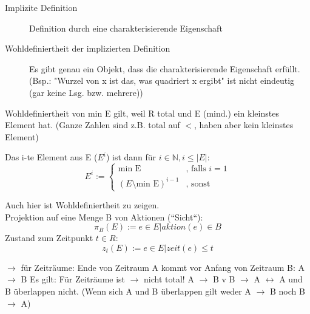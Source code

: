 \begin{description}
\item[Implizite Definition] Definition durch eine charakterisierende Eigenschaft
\item[Wohldefiniertheit der implizierten Definition] Es gibt genau ein Objekt, dass die charakterisierende Eigenschaft erfüllt.
 (Bsp.: "Wurzel von x ist das, was quadriert x ergibt" ist nicht eindeutig (gar keine Lsg. bzw. mehrere))
\end{description}

Wohldefiniertheit von min E gilt, weil R total und E (mind.) ein kleinstes Element hat. (Ganze Zahlen sind z.B. total auf $<$, haben aber kein kleinstes Element)

Das i-te Element aus E ($E^i$) ist dann für $i \in \mathbb{N}, i \leq |E|$:
\begin{equation*}
E^i := \begin{cases}
\text{min E}&\text{, falls }i = 1\\
(E \setminus{\text{min E}})^{i-1}& \text{, sonst}
\end{cases}
\end{equation*}

Auch hier ist Wohldefiniertheit zu zeigen.\\
Projektion auf eine Menge B von Aktionen (“Sicht“):
\begin{equation*}
\pi_B(E) := e \in E | aktion(e) \in B
\end{equation*}
Zustand zum Zeitpunkt $t \in R$:
\begin{equation*}
z_t(E) := e \in E | zeit(e) \leq t
\end{equation*}


$\rightarrow$ für Zeiträume: Ende von Zeitraum A kommt vor Anfang von Zeitraum B: A $\rightarrow$ B Es gilt: Für Zeiträume ist $\rightarrow$ nicht total!
A $\rightarrow$ B v B $\rightarrow$ A $\leftrightarrow$ A und B überlappen nicht. (Wenn sich A und B überlappen gilt weder A  $\rightarrow$ B noch B  $\rightarrow$ A)

